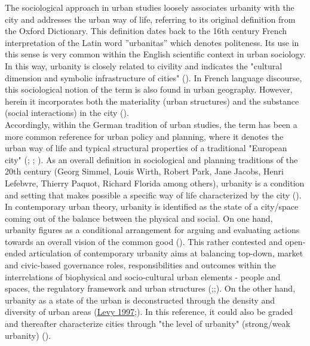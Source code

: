 \documentclass[11pt]{report}
\begin{document}
{{{The sociological approach in urban studies loosely associates urbanity with the city and addresses the urban way of life, referring to its original definition from the Oxford Dictionary. This definition dates back to the 16th century French interpretation of the Latin word ”urbanitas” which denotes politeness. Its use in this sense is very common within the English scientific context in urban sociology. In this way, urbanity is closely related to civility and indicates the "cultural dimension and symbolic infrastructure of cities" (\href{Zijderveld}{\citealt{zijderveld_theory_2011}}).
In French language discourse, this sociological notion of the term is also found in urban geography. However, herein it incorporates both the materiality (urban structures) and the substance (social interactions) in the city (\citealt{Bisson 2016}). 
\\

Accordingly, within the German tradition of urban studies, the term has been a more common reference for urban policy and planning, where it denotes the urban way of life and typical structural properties of a traditional "European city" (\href{Prigge}{\citealt{Prigge_urbanitaet_1996}}; \href{wust}{\citealt{wust_urbanity_2005}}; \href{Lossau}{\citealt{lossau_new_2008}}). 
As an overall definition in sociological and planning traditions of the 20th century (Georg Simmel, Louis Wirth, Robert Park, Jane Jacobs, Henri Lefebvre, Thierry Paquot, Richard Florida among others), urbanity is a condition and setting that makes possible a specific way of life characterized by the city (\href{levy}{\cite{Lévy 2013}}). 
\\

In contemporary urban theory, urbanity is identified as the state of a city/space coming out of the balance  between the physical and social. On one hand, urbanity figures  as a conditional arrangement for arguing and evaluating actions towards an overall vision of the common good (\href{Holden}{\citealt{holden_justifying_2015}}).
This rather contested and open-ended articulation of contemporary urbanity aims at balancing top-down, market and civic-based governance roles, responsibilities and outcomes within the interrelations of biophysical and socio-cultural urban elements - people and spaces, the regulatory framework and urban structures (\href{Groth}{\citealt{groth_reclaiming_2005}};\href{Tardin}{\citealt{tardin_landscape_2014}};\href{Holden}{\citealt{holden_justifying_2015}}).
On the other hand, urbanity as a state of the urban is deconstructed through the density and diversity of urban areas (\href{Levy}{Levy 1997};\href{Levy}{\citealt{levy_liens_2013}}). In this reference, it could also be graded and thereafter characterize cities through  "the level of urbanity" (strong/weak urbanity) (\citealt{levy_liens_2013}).
\\

}}}
\end{document}
